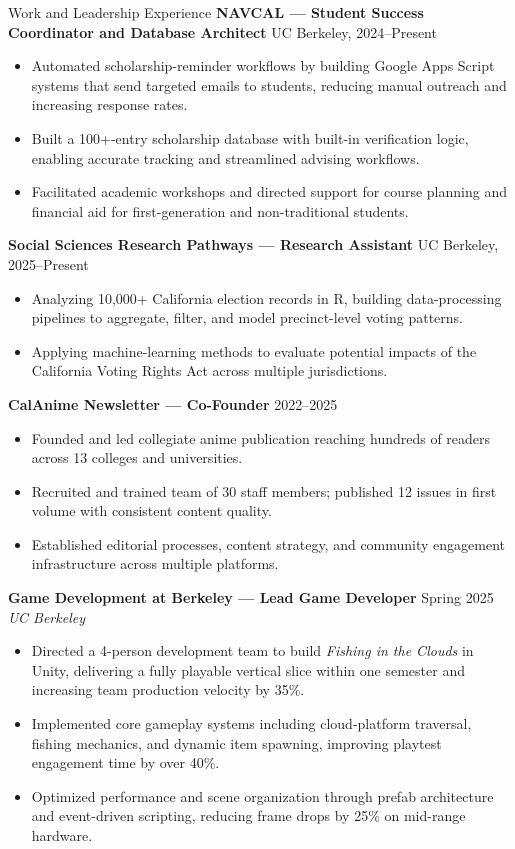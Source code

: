 \documentclass{resume}
\begin{document}
\begin{rSection}{Work and Leadership Experience}
\textbf{NAVCAL — Student Success Coordinator and Database Architect} \hfill UC Berkeley, 2024–Present
\begin{itemize}
  \item Automated scholarship-reminder workflows by building Google Apps Script systems that send targeted emails to students, reducing manual outreach and increasing response rates.
  \item Built a 100+-entry scholarship database with built-in verification logic, enabling accurate tracking and streamlined advising workflows.
  \item Facilitated academic workshops and directed support for course planning and financial aid for first-generation and non-traditional students.
\end{itemize}

\textbf{Social Sciences Research Pathways — Research Assistant} \hfill UC Berkeley, 2025–Present
\begin{itemize}
  \item Analyzing 10,000+ California election records in R, building data-processing pipelines to aggregate, filter, and model precinct-level voting patterns.
  \item Applying machine-learning methods to evaluate potential impacts of the California Voting Rights Act across multiple jurisdictions.
\end{itemize}

\textbf{CalAnime Newsletter — Co-Founder} \hfill 2022–2025
\begin{itemize}
  \item Founded and led collegiate anime publication reaching hundreds of readers across 13 colleges and universities.
  \item Recruited and trained team of 30 staff members; published 12 issues in first volume with consistent content quality.
  \item Established editorial processes, content strategy, and community engagement infrastructure across multiple platforms.
\end{itemize}

\textbf{Game Development at Berkeley — Lead Game Developer} \hfill Spring 2025 \\
\textit{UC Berkeley}
\begin{itemize}
  \item Directed a 4-person development team to build \textit{Fishing in the Clouds} in Unity, delivering a fully playable vertical slice within one semester and increasing team production velocity by 35\%.
  \item Implemented core gameplay systems including cloud‑platform traversal, fishing mechanics, and dynamic item spawning, improving playtest engagement time by over 40\%.
  \item Optimized performance and scene organization through prefab architecture and event-driven scripting, reducing frame drops by 25\% on mid-range hardware.
\end{itemize}



\end{rSection}
\end{document}
